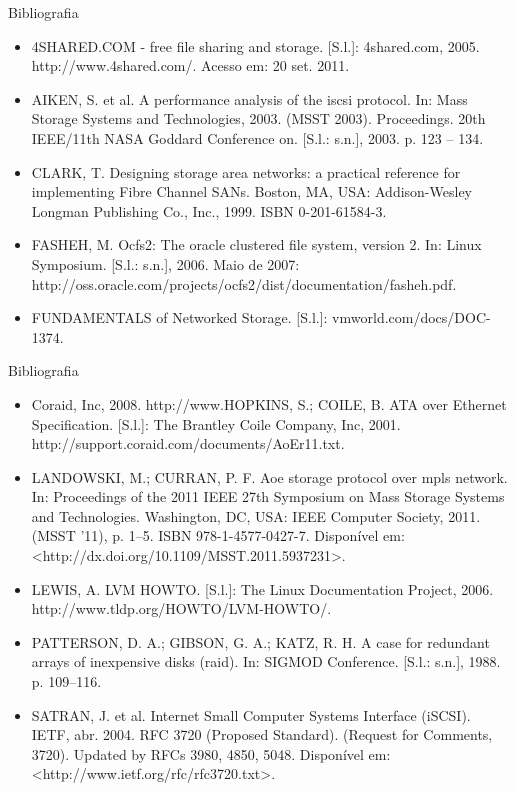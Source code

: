 \documentclass{beamer}
\begin{document}
\begin{frame}{Bibliografia}
\begin{itemize}
\item 4SHARED.COM - free file sharing and storage. [S.l.]: 4shared.com, 2005. http://www.4shared.com/. Acesso em: 20 set. 2011.
\item AIKEN, S. et al. A performance analysis of the iscsi protocol. In: Mass Storage Systems and Technologies, 2003. (MSST 2003). Proceedings. 20th IEEE/11th NASA Goddard Conference on. [S.l.: s.n.], 2003. p. 123 – 134.
\item CLARK, T. Designing storage area networks: a practical reference for implementing Fibre Channel SANs. Boston, MA, USA: Addison-Wesley Longman Publishing Co., Inc., 1999. ISBN 0-201-61584-3.
\item FASHEH, M. Ocfs2: The oracle clustered file system, version 2. In: Linux Symposium. [S.l.: s.n.], 2006. Maio de 2007: http://oss.oracle.com/projects/ocfs2/dist/documentation/fasheh.pdf.
\item  FUNDAMENTALS of Networked Storage. [S.l.]: vmworld.com/docs/DOC-1374. 
\end{itemize}
\end{frame}

\begin{frame}{Bibliografia}
\begin{itemize}
\item Coraid, Inc, 2008. http://www.HOPKINS, S.; COILE, B. ATA over Ethernet Specification. [S.l.]: The Brantley Coile Company, Inc, 2001. http://support.coraid.com/documents/AoEr11.txt.
\item LANDOWSKI, M.; CURRAN, P. F. Aoe storage protocol over mpls network. In: Proceedings of the 2011 IEEE 27th Symposium on Mass Storage Systems and Technologies. Washington, DC, USA: IEEE Computer Society, 2011. (MSST ’11), p. 1–5. ISBN 978-1-4577-0427-7. Disponível em: <http://dx.doi.org/10.1109/MSST.2011.5937231>.
\item LEWIS, A. LVM HOWTO. [S.l.]: The Linux Documentation Project, 2006. http://www.tldp.org/HOWTO/LVM-HOWTO/.
\item PATTERSON, D. A.; GIBSON, G. A.; KATZ, R. H. A case for redundant arrays of inexpensive disks (raid). In: SIGMOD Conference. [S.l.: s.n.], 1988. p. 109–116.
\item SATRAN, J. et al. Internet Small Computer Systems Interface (iSCSI). IETF, abr. 2004. RFC 3720 (Proposed Standard). (Request for Comments, 3720). Updated by RFCs 3980, 4850, 5048. Disponível em: <http://www.ietf.org/rfc/rfc3720.txt>.
\end{itemize}
\end{frame}
\end{document}
